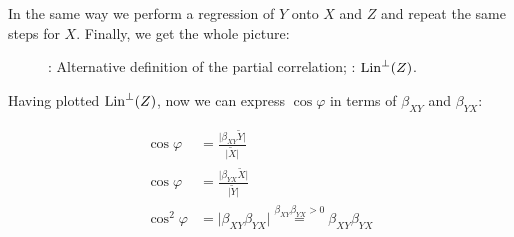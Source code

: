 In the same way we perform a regression of $Y$ onto $X$ and $Z$ and repeat the
same steps for $X$. Finally, we get the whole picture:

\begin{figure}[ht!]
\begin{center}
\caption{: Alternative definition of the partial correlation;
: $\operatorname{Lin}^{\perp}(Z)$.}
\end{center}
\end{figure}

Having plotted $\operatorname{Lin}^{\perp}(Z)$, now we can express $\cos \varphi$ in terms of $\beta_{XY}$
and $\beta_{YX}$:

\begin{equation*}%
\begin{split}
\cos \varphi &= \frac{\vert \beta_{XY} \widetilde Y \vert}{\vert \widetilde X \vert} \\
\cos \varphi &= \frac{\vert \beta_{YX} \widetilde X \vert}{\vert \widetilde Y \vert} \\
\cos^2 \varphi &= \vert \beta_{XY} \beta_{YX} \vert \stackrel{\beta_{XY} \beta_{YX} > 0}{=} \beta_{XY} \beta_{YX}
\end{split}
\end{equation*}

